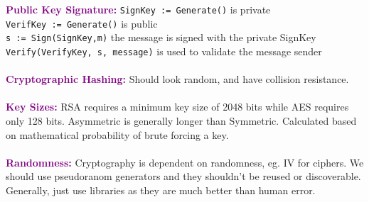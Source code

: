 \documentclass[a4paper,10pt]{article}
\begin{document}
\textcolor{Purple}{\textbf{Public Key Signature:}} 
\texttt{SignKey := Generate()} is private \\
\texttt{VerifKey := Generate()} is public\\
\texttt{s := Sign(SignKey,m)} the message is signed with the private SignKey \\
\texttt{Verify(VerifyKey, s, message)} is used to validate the message sender\\\\
\textcolor{Purple}{\textbf{Cryptographic Hashing:}} Should look random, and have collision resistance. \\\\ 
\textcolor{Purple}{\textbf{Key Sizes:}} RSA requires a minimum key size of 2048 bits while AES requires only 128 bits. Asymmetric is generally longer than Symmetric. Calculated based on mathematical probability of brute forcing a key.\\\\
\textcolor{Purple}{\textbf{Randomness:}} Cryptography is dependent on randomness, eg. IV for ciphers. We should use pseudoranom generators and they shouldn't be reused or discoverable. Generally, just use libraries as they are much better than human error. \\\\
\end{document}

